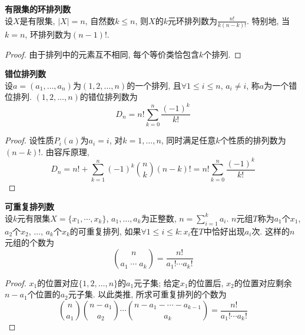 \begin{col} \textbf{有限集的环排列数}\\
设$X$是有限集, $|X|=n$, 自然数$k\le n$, 则$X$的$k$元环排列数为$\frac{n!}{k(n-k)!}$. 特别地, 当$k=n$, 环排列数为$(n-1)!$. 
\end{col}
\begin{proof}
由于排列中的元素互不相同, 每个等价类恰包含$k$个排列. 
\end{proof}

\begin{pro} \textbf{错位排列数}\\
设$a=(a_1,\dots,a_n)$为$(1,2,\dots,n)$的一个排列, 且$\forall 1\le i\le n$, $a_i\neq i$, 称$a$为一个错位排列. $(1,2,\dots,n)$的错位排列数为
\begin{equation}
    D_n = n! \sum_{k=0}^n \frac{(-1)^k }{k!}
\end{equation}
\end{pro}
\begin{proof}
设性质$P_i(a)$为$a_i=i$, 对$k=1,\dots,n$, 同时满足任意$k$个性质的排列数为$(n-k)!$. 由容斥原理,
\begin{equation}
    D_n = n! + \sum_{k=1}^n (-1)^k \binom{n}{k} (n-k)! = n! \sum_{k=0}^n \frac{(-1)^k }{k!}
\end{equation}
\end{proof}

\begin{pro} \textbf{可重复排列数}\\
设$k$元有限集$X=\{x_1,\cdots,x_k\}$, $a_1,\dots, a_k$为正整数, $n=\sum_{i=1}^k a_i$. $n$元组$T$称为$a_1$个$x_1$, $a_2$个$x_2$, $\dots$, $a_k$个$x_k$的可重复排列, 如果$\forall 1\le i \le k: x_i$在$T$中恰好出现$a_i$次. 这样的$n$元组的个数为
\begin{equation}
    \binom{n}{a_1\;\cdots\;a_k}=\frac{n!}{a_1!\cdots a_k!}
\end{equation}
\label{pro:repeat_permutation}
\end{pro}
\begin{proof}
$x_1$的位置对应$\{1,2,\dots,n\}$的$a_1$元子集; 给定$x_1$的位置后, $x_2$的位置对应剩余$n-a_1$个位置的$a_2$元子集. 以此类推, 所求可重复排列的个数为
\begin{equation}
    \binom{n}{a_1}\binom{n-a_1}{a_2}\cdots \binom{n-a_1-\cdots-a_{k-1}}{a_k} = \frac{n!}{a_1!\cdots a_k!}
\end{equation}
\end{proof}

